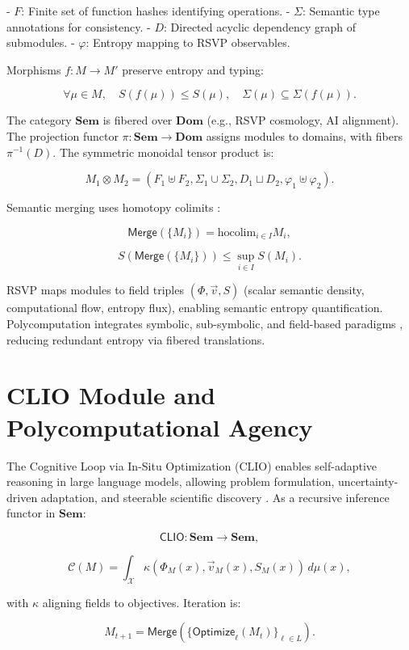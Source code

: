 \documentclass[12pt]{article}
\begin{document}
- $ F $: Finite set of function hashes identifying operations.
- $ \Sigma $: Semantic type annotations for consistency.
- $ D $: Directed acyclic dependency graph of submodules.
- $ \varphi $: Entropy mapping to RSVP observables.

Morphisms $ f: M \to M' $ preserve entropy and typing:

\[ \forall \mu \in M, \quad S(f(\mu)) \leq S(\mu), \quad \Sigma(\mu) \subseteq \Sigma(f(\mu)). \]

The category $ \mathbf{Sem} $ is fibered over $ \mathbf{Dom} $ (e.g., RSVP cosmology, AI alignment). The projection functor $ \pi: \mathbf{Sem} \to \mathbf{Dom} $ assigns modules to domains, with fibers $ \pi^{-1}(D) $. The symmetric monoidal tensor product is:

\[ M_1 \otimes M_2 = (F_1 \uplus F_2, \Sigma_1 \cup \Sigma_2, D_1 \sqcup D_2, \varphi_1 \uplus \varphi_2). \]

Semantic merging uses homotopy colimits \citep{Lurie2009, Riehl2016}:

\[ \mathsf{Merge}(\{M_i\}) = \mathrm{hocolim}_{i \in I} M_i, \]

\[ S(\mathsf{Merge}(\{M_i\})) \leq \sup_{i \in I} S(M_i). \]

RSVP maps modules to field triples $ (\Phi, \vec{v}, S) $ (scalar semantic density, computational flow, entropy flux), enabling semantic entropy quantification. Polycomputation integrates symbolic, sub-symbolic, and field-based paradigms \citep{AbramskyCoecke2004}, reducing redundant entropy via fibered translations.

\section{CLIO Module and Polycomputational Agency}
\label{sec:clio-polyagency}

The Cognitive Loop via In-Situ Optimization (CLIO) enables self-adaptive reasoning in large language models, allowing problem formulation, uncertainty-driven adaptation, and steerable scientific discovery \citep{ChengBroadbentChappell2025}. As a recursive inference functor in $ \mathbf{Sem} $:

\[ \mathsf{CLIO}: \mathbf{Sem} \to \mathbf{Sem}, \]

\[ \mathcal{C}(M) = \int_{\mathcal{X}} \kappa(\Phi_M(x), \vec{v}_M(x), S_M(x)) \, d\mu(x), \]

with $ \kappa $ aligning fields to objectives. Iteration is:

\[ M_{t+1} = \mathsf{Merge}(\{ \mathsf{Optimize}_\ell(M_t) \}_{\ell \in L}). \]
\end{document}
